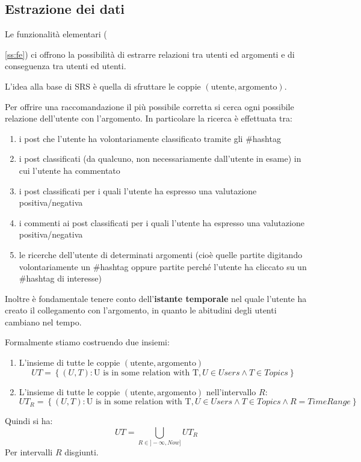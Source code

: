 \subsection{Estrazione dei dati}
Le funzionalità elementari ({\ref{ss:fe}) ci offrono la possibilità di estrarre relazioni tra utenti ed argomenti e di conseguenza tra utenti ed utenti.

L'idea alla base di SRS è quella di sfruttare le coppie $(\text{utente}, \text{argomento})$.

Per offrire una raccomandazione il più possibile corretta si cerca ogni possibile relazione dell'utente con l'argomento. In particolare la ricerca è effettuata tra: 
\begin{enumerate}
    \item i post che l'utente ha volontariamente classificato tramite gli \#hashtag
    \item i post classificati (da qualcuno, non necessariamente dall'utente in esame) in cui l'utente ha commentato
    \item i post classificati per i quali l'utente ha espresso una valutazione positiva/negativa
    \item i commenti ai post classificati per i quali l'utente ha espresso una valutazione positiva/negativa
    \item le ricerche dell'utente di determinati argomenti (cioè quelle partite digitando volontariamente un \#hashtag oppure partite perché l'utente ha cliccato su un \#hashtag di interesse)
\end{enumerate}

Inoltre è fondamentale tenere conto dell'\textbf{istante temporale} nel quale l'utente ha creato il collegamento con l'argomento, in quanto le abitudini degli utenti cambiano nel tempo.

Formalmente stiamo costruendo due insiemi:
\begin{enumerate}
    \item L'insieme di tutte le coppie $(\text{utente}, \text{argomento})$
        $$ UT = \left\{ (U, T) : \text{U is in some relation with T}, U \in Users \land T \in Topics \right\} $$
    \item L'insieme di tutte le coppie $(\text{utente}, \text{argomento})$ nell'intervallo $R$:
        $$ UT_R = \left\{ (U, T) : \text{U is in some relation with T}, U \in Users \land T \in Topics \land R = Time Range \right\}$$
\end{enumerate}

Quindi si ha:
$$ UT = \bigcup_{R \in ]-\infty, Now]} UT_R $$
Per intervalli $R$ disgiunti.

}

